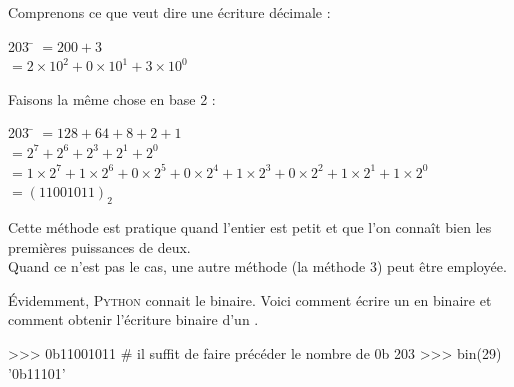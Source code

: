 \documentclass[a4paper,12pt,french]{book}
\begin{document}
\begin{methode}
Comprenons ce que veut dire une écriture décimale :
			\begin{tabbing}
				203	\= 	$=200+3$	\\

					\>	$=2\times 10^2+0\times 10^1+3\times 10^0$
			\end{tabbing}
Faisons la même chose en base 2 :
			\begin{tabbing}
				203	\= 	$=128+64+8+2+1$	\\

					\>	$=2^7+2^6+2^3+2^1+2^0$	\\

					\>	$=1\times 2^7+1\times 2^6+0\times 2^5 + 0\times 2^4 +1\times 2^3+0\times 2^2 + 1\times
					2^1+1\times 2^0$	\\

					\> $=(11001011)_2$
			\end{tabbing}
			Cette méthode est pratique quand l'entier est petit et que l'on connaît bien les premières puissances de deux.\\
			Quand ce n'est pas le cas, une autre méthode (la méthode 3) peut être employée.

\end{methode}
\'Evidemment, \textsc{Python} connait le binaire. Voici comment écrire un  en binaire et comment obtenir l'écriture
binaire d'un .
\begin{pythonshell}
>>> 0b11001011 # il suffit de faire précéder le nombre de 0b
203
>>> bin(29)
'0b11101'
\end{pythonshell}
\end{document}

